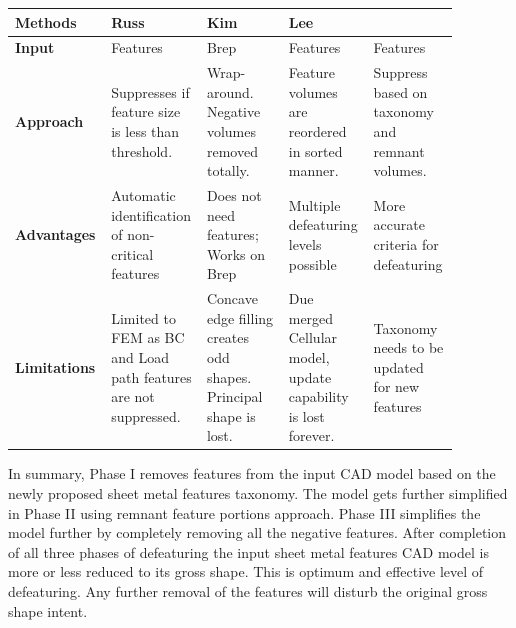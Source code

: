 \bigskip
\begin{minipage}[t]{0.9\linewidth}
  \centering
  \label{tbl:defeaturing:benchmarking}
\begin{longtable}[htp]{@{} p{0.16\linewidth} |p{0.18\linewidth} | p{0.18\linewidth}| p{0.18\linewidth} |p{0.18\linewidth}@{}}
\toprule
\textbf{Methods} & \textbf{Russ \cite{Russ2012}} &	\textbf{Kim \cite{Kim2005}} &	\textbf{Lee \cite{Lee2005}} & \textbf{\mysystemname}\\
\midrule
\textbf{Input} & Features	& Brep	& Features	& Features\\
\midrule
\textbf{Approach} & Suppresses if feature size is less than threshold.&
Wrap-around. Negative volumes removed totally. &
Feature volumes are reordered in sorted manner.&
Suppress based on taxonomy and remnant volumes.\\
\midrule
\textbf{Advantages} & Automatic identification of non-critical features &
 Does not need features; Works on Brep&
 Multiple defeaturing levels possible& More accurate criteria for defeaturing
\\
\midrule
\textbf{Limitations} & Limited to FEM as BC and Load path features are not suppressed. &
Concave edge filling creates odd shapes. Principal shape is lost. &
Due merged Cellular model, update capability is lost forever. &
Taxonomy needs to be updated for new features\\	
\bottomrule
\end{longtable}

\end{minipage}


\bigskip


In summary, Phase I removes features from the input CAD model based on the newly proposed sheet metal features taxonomy. The model gets further simplified in Phase II using remnant feature portions approach. Phase III simplifies the model further by completely removing all the negative features. After completion of all three phases of defeaturing the input sheet metal features CAD model is more or less reduced to its gross shape. This is optimum and effective level of defeaturing. Any further removal of the features will disturb the original gross shape intent.

